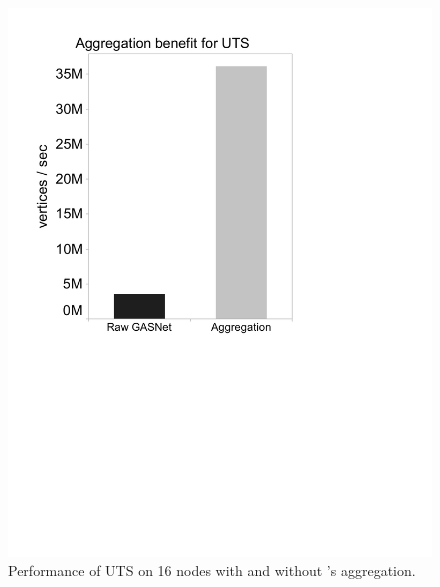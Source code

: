 {\begin{figure}[htb]
\begin{center}
  \includegraphics[width=0.95\columnwidth]{figs/no_aggregation_uts.pdf}
\begin{minipage}{0.95\columnwidth}
  \caption{\label{fig:no-aggregation-uts} Performance of UTS on 16
      nodes with and without \Grappa's aggregation.}
\end{minipage}
\vspace{-3ex}
\end{center}
\end{figure}

}
